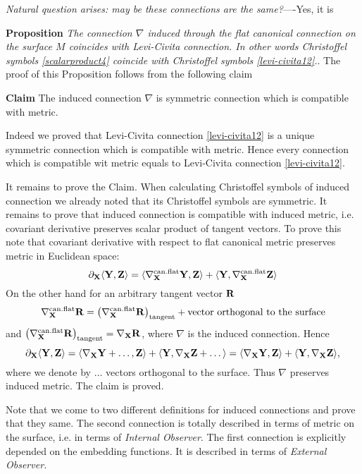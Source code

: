 \documentclass[12pt]{article}
\theoremstyle{theorem}
\numberwithin{equation}{section}
\begin{document}
 {\sl Natural question arises: may be these connections are the same?}----Yes, it is

              \m

    {\bf Proposition} {\it The connection $\nabla$ induced through the flat canonical connection on the surface
    $M$  coincides with Levi-Civita connection. In other words Christoffel symbols \eqref{scalarproduct4}
    coincide with Christoffel symbols \eqref{levi-civita12}.}.
    The proof of this Proposition follows from the  following claim

              \m
       {\bf Claim} The induced connection $\nabla$ is symmetric connection which is compatible with metric.


     Indeed we proved that Levi-Civita connection \eqref{levi-civita12} is a unique symmetric connection which is compatible with metric.
     Hence every connection which is compatible wit metric equals to Levi-Civita connection \eqref{levi-civita12}.


     It remains to prove the Claim.  When calculating Christoffel symbols of induced connection we already
     noted that its Christoffel symbols are symmetric. It remains to prove that induced connection is compatible
     with induced metric, i.e. covariant derivative preserves scalar product of tangent vectors.
     To prove this note that covariant derivative with respect to flat canonical metric preserves
 metric in Euclidean space:
                              $$
    \partial_{\bf X}\langle {\bf Y},{\bf Z}\rangle=\langle \nabla^{\rm can.flat}_{\bf X}{\bf Y},{\bf Z}\rangle+\langle {\bf Y},\nabla^{\rm can.flat}_{\bf X}{\bf Z}\rangle
                              $$
                 On the other hand for an arbitrary tangent vector ${\bf R}$
                 $$
   \nabla^{\rm can.flat}_{\bf X} {\bf R}= \left(\nabla^{\rm can.flat}_{\bf X} {\bf R}\right)_{\rm tangent}+\hbox {vector orthogonal to the surface}
                $$
    and $\left(\nabla^{\rm can.flat}_{\bf X} {\bf R}\right)_{\rm tangent}=\nabla_{\bf X}{\bf R}$, where $\nabla$ is the induced connection. Hence
                             $$
     \partial_{\bf X}\langle {\bf Y},{\bf Z}\rangle=\langle \nabla_{\bf X}{\bf Y}+\dots,{\bf Z}\rangle+\langle {\bf Y},\nabla_{\bf X}{\bf Z}+\dots\rangle=
     \langle \nabla_{\bf X}{\bf Y},{\bf Z}\rangle+\langle {\bf Y},\nabla_{\bf X}{\bf Z}\rangle,
                             $$
 where we denote by $\dots$ vectors orthogonal to the surface.  Thus
 $\nabla$ preserves induced metric. The claim is proved.


 Note that we come to two different definitions for induced connections and prove that they same.
 The second connection is totally described in terms of metric on the surface, i.e. in terms of {\it Internal Observer}.
  The first connection
 is explicitly depended on the embedding functions. It is described in terms of {\it External Observer.}
\end{document}
